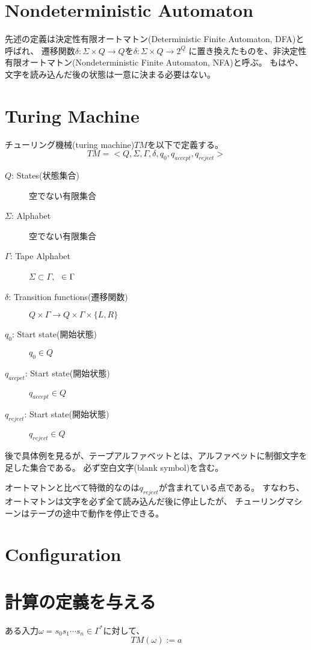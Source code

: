 \documentclass[b5paper,fleqn]{ltjsarticle}
\begin{document}
\section{Nondeterministic Automaton}
先述の定義は決定性有限オートマトン(Deterministic Finite Automaton, DFA)と呼ばれ、
遷移関数$\delta:\Sigma\times Q\rightarrow Q$を$\delta:\Sigma\times Q\rightarrow 2^Q$
に置き換えたものを、非決定性有限オートマトン(Nondeterministic Finite Automaton, NFA)と呼ぶ。
もはや、文字を読み込んだ後の状態は一意に決まる必要はない。

\newpage
\section{Turing Machine}
チューリング機械(turing machine)$TM$を以下で定義する。
\[TM=<Q,\Sigma,\Gamma,\delta,q_0,q_{accept},q_{reject}>\]
\begin{description}
\item[$Q$: States(状態集合)] 空でない有限集合
\item[$\Sigma$: Alphabet] 空でない有限集合
\item[$\Gamma$: Tape Alphabet] $\Sigma\subset\Gamma,$ \textvisiblespace$\hskip3pt\in\Gamma$
\item[$\delta$: Transition functions(遷移関数)] $Q\times\Gamma\rightarrow Q\times\Gamma\times\{L,R\}$
\item[$q_0$: Start state(開始状態)] $q_0\in Q$
\item[$q_{accpet}$: Start state(開始状態)] $q_{accept}\in Q$
\item[$q_{reject}$: Start state(開始状態)] $q_{reject}\in Q$
\end{description}
後で具体例を見るが、テープアルファベットとは、アルファベットに制御文字を足した集合である。
必ず空白文字(blank symbol)\textvisiblespace を含む。\par
オートマトンと比べて特徴的なのは$q_{reject}$が含まれている点である。
すなわち、オートマトンは文字を必ず全て読み込んだ後に停止したが、
チューリングマシーンはテープの途中で動作を停止できる。

\section{Configuration}

\section{計算の定義を与える}
ある入力$\omega=s_0s_1\cdots s_n\in\Gamma^*$に対して、
\[TM(\omega):=a\]
\end{document}
